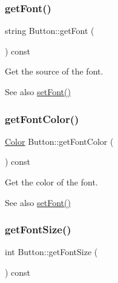 \subsubsection{\texorpdfstring{get\+Font()}{getFont()}}
{\footnotesize\ttfamily string Button\+::get\+Font (\begin{DoxyParamCaption}{ }\end{DoxyParamCaption}) const\hspace{0.3cm}{\ttfamily [inline]}}



Get the source of the font. 

\begin{DoxySeeAlso}{See also}
\mbox{\hyperlink{class_button_ae899f37b125b8514af8153b694dad678}{set\+Font()}} 
\end{DoxySeeAlso}
\mbox{\label{class_button_a2e0b249c69141b3c88c797015b2464c6}} 
\subsubsection{\texorpdfstring{get\+Font\+Color()}{getFontColor()}}
{\footnotesize\ttfamily \mbox{\hyperlink{class_color}{Color}} Button\+::get\+Font\+Color (\begin{DoxyParamCaption}{ }\end{DoxyParamCaption}) const\hspace{0.3cm}{\ttfamily [inline]}}



Get the color of the font. 

\begin{DoxySeeAlso}{See also}
\mbox{\hyperlink{class_button_ae899f37b125b8514af8153b694dad678}{set\+Font()}} 
\end{DoxySeeAlso}
\mbox{\label{class_button_a29dcfb418006f9dee46e654b1124e950}} 
\subsubsection{\texorpdfstring{get\+Font\+Size()}{getFontSize()}}
{\footnotesize\ttfamily int Button\+::get\+Font\+Size (\begin{DoxyParamCaption}{ }\end{DoxyParamCaption}) const\hspace{0.3cm}{\ttfamily [inline]}}



